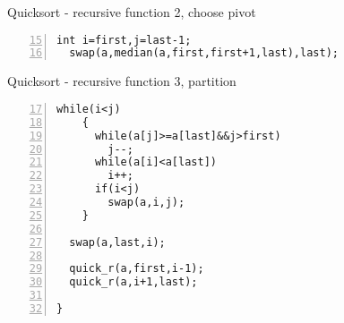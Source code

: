 \documentclass{beamer}
\begin{document}
\begin{frame}[fragile]{Quicksort - recursive function 2, choose pivot}
\begin{lstlisting}[numbers=left,firstnumber=15]
  int i=first,j=last-1;
  swap(a,median(a,first,first+1,last),last);
\end{lstlisting}
\end{frame}
\begin{frame}[fragile]{Quicksort - recursive function 3, partition}
\begin{lstlisting}[numbers=left,firstnumber=17]
  while(i<j)
    {
      while(a[j]>=a[last]&&j>first)
        j--;
      while(a[i]<a[last])
        i++;
      if(i<j)
        swap(a,i,j);
    }

  swap(a,last,i);

  quick_r(a,first,i-1);
  quick_r(a,i+1,last);

}
\end{lstlisting}
\end{frame}
\end{document}
